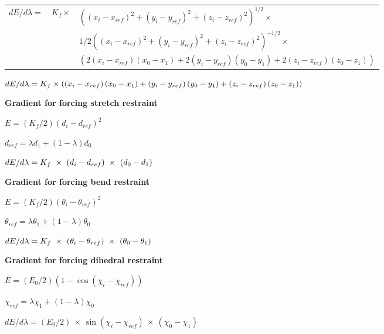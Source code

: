 \begin{tabular}{lll}
$dE/d\lambda =$ & $K_{f}\times $ & $\left( \left( x_{i}-x_{ref}\right)
^{2}+\left( y_{i}-y_{ref}\right) ^{2}+\left( z_{i}-z_{ref}\right)
^{2}\right) ^{1/2}\times $ \\ 
&  & $1/2\left( \left( x_{i}-x_{ref}\right) ^{2}+\left( y_{i}-y_{ref}\right)
^{2}+\left( z_{i}-z_{ref}\right) ^{2}\right) ^{-1/2}\times $ \\ 
&  & $\left( 2\left( x_{i}-x_{ref}\right) \left( x_{0}-x_{1}\right) +2\left(
y_{i}-y_{ref}\right) \left( y_{0}-y_{1}\right) +2\left( z_{i}-z_{ref}\right)
\left( z_{0}-z_{1}\right) \right) $
\end{tabular}

$dE/d\lambda =K_{f}\times \left( \left( x_{i}-x_{ref}\right) \left(
x_{0}-x_{1}\right) +\left( y_{i}-y_{ref}\right) \left( y_{0}-y_{1}\right)
+\left( z_{i}-z_{ref}\right) \left( z_{0}-z_{1}\right) \right) \bigskip $

{\bf Gradient for forcing stretch restraint}

$E=\left( K_{f}/2\right) \left( d_{i}-d_{ref}\right) ^{2}$

$d_{ref}=\lambda d_{1}+\left( 1-\lambda \right) d_{0}$

$dE/d\lambda =K_{f}~\times ~\left( d_{i}-d_{ref}\right) ~\times ~\left(
d_{0}-d_{1}\right) \bigskip $

{\bf Gradient for forcing bend restraint}

$E=\left( K_{f}/2\right) \left( \theta _{i}-\theta _{ref}\right) ^{2}$

$\theta _{ref}=\lambda \theta _{1}+\left( 1-\lambda \right) \theta _{0}$

$dE/d\lambda =K_{f}~\times ~\left( \theta _{i}-\theta _{ref}\right) ~\times 
~\left( \theta _{0}-\theta _{1}\right) \bigskip $

{\bf Gradient for forcing dihedral restraint}

$E=\left( E_{0}/2\right) \left( 1-\cos \left( \chi _{i}-\chi _{ref}\right)
\right) $

$\chi _{ref}=\lambda \chi _{1}+\left( 1-\lambda \right) \chi _{0}$

$dE/d\lambda =\left( E_{0}/2\right) ~\times ~\sin \left( \chi _{i}-\chi
_{ref}\right) ~\times ~\left( \chi _{0}-\chi _{1}\right) $

